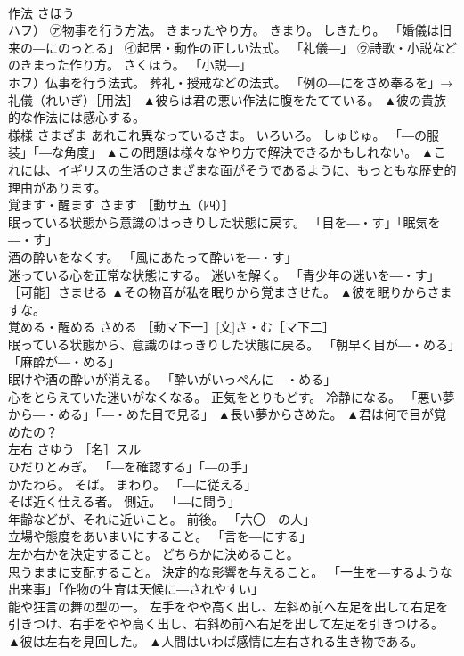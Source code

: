 \documentclass[8pt]{extreport}
\begin{document}
\begin{CJK}{UTF8}{min}
\\	作法	さほう	
\\	ハフ） ㋐物事を行う方法。 きまったやり方。 きまり。 しきたり。 「婚儀は旧来の―にのっとる」 ㋑起居・動作の正しい法式。 「礼儀―」 ㋒詩歌・小説などのきまった作り方。 さくほう。 「小説―」 
\\	ホフ）仏事を行う法式。 葬礼・授戒などの法式。 「例の―にをさめ奉るを」→礼儀（れいぎ）［用法］	▲彼らは君の悪い作法に腹をたてている。 ▲彼の貴族的な作法には感心する。
\\	様様	さまざま	あれこれ異なっているさま。 いろいろ。 しゅじゅ。 「―の服装」「―な角度」	▲この問題は様々なやり方で解決できるかもしれない。 ▲これには、イギリスの生活のさまざまな面がそうであるように、もっともな歴史的理由があります。
\\	覚ます・醒ます	さます	［動サ五（四）］ 
\\	眠っている状態から意識のはっきりした状態に戻す。 「目を―・す」「眠気を―・す」 
\\	酒の酔いをなくす。 「風にあたって酔いを―・す」 
\\	迷っている心を正常な状態にする。 迷いを解く。 「青少年の迷いを―・す」 ［可能］さませる	▲その物音が私を眠りから覚まさせた。 ▲彼を眠りからさますな。
\\	覚める・醒める	さめる	［動マ下一］[文]さ・む［マ下二］ 
\\	眠っている状態から、意識のはっきりした状態に戻る。 「朝早く目が―・める」「麻酔が―・める」 
\\	眠けや酒の酔いが消える。 「酔いがいっぺんに―・める」 
\\	心をとらえていた迷いがなくなる。 正気をとりもどす。 冷静になる。 「悪い夢から―・める」「―・めた目で見る」	▲長い夢からさめた。 ▲君は何で目が覚めたの？
\\	左右	さゆう	［名］スル 
\\	ひだりとみぎ。 「―を確認する」「―の手」 
\\	かたわら。 そば。 まわり。 「―に従える」 
\\	そば近く仕える者。 側近。 「―に問う」 
\\	年齢などが、それに近いこと。 前後。 「六〇―の人」 
\\	立場や態度をあいまいにすること。 「言を―にする」 
\\	左か右かを決定すること。 どちらかに決めること。 
\\	思うままに支配すること。 決定的な影響を与えること。 「一生を―するような出来事」「作物の生育は天候に―されやすい」 
\\	能や狂言の舞の型の一。 左手をやや高く出し、左斜め前へ左足を出して右足を引きつけ、右手をやや高く出し、右斜め前へ右足を出して左足を引きつける。	▲彼は左右を見回した。 ▲人間はいわば感情に左右される生き物である。

\end{CJK}
\end{document}
